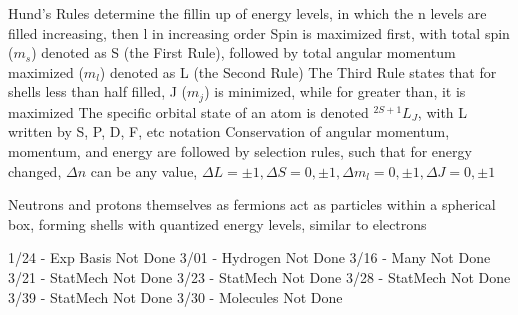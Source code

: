 \documentclass[11 pt, twoside]{article}
\newenvironment{outline*}
{
	\begin{outline}[enumerate]
	}
	{\end{outline}
}
\begin{document}
\begin{outline*}
\1 Hund's Rules determine the fillin up of energy levels, in which the n levels are filled increasing, then l in increasing order
	\2 Spin is maximized first, with total spin ($m_s$) denoted as S (the First Rule), followed by total angular momentum maximized ($m_l$) denoted as L (the Second Rule)
	\2 The Third Rule states that for shells less than half filled, J ($m_j$) is minimized, while for greater than, it is maximized
	\2 The specific orbital state of an atom is denoted $^{2S + 1}L_J$, with L written by S, P, D, F, etc notation
	\2 Conservation of angular momentum, momentum, and energy are followed by selection rules, such that for energy changed, $\Delta n$ can be any value, $\Delta L = \pm 1, \Delta S = 0, \pm 1, \Delta m_l = 0, \pm 1, \Delta J = 0, \pm 1$

\1 Neutrons and protons themselves as fermions act as particles within a spherical box, forming shells with quantized energy levels, similar to electrons

1/24 - Exp Basis Not Done
3/01 - Hydrogen Not Done
3/16 - Many Not Done
3/21 - StatMech Not Done
3/23 - StatMech Not Done
3/28 - StatMech Not Done
3/39 - StatMech Not Done
3/30 - Molecules Not Done

\end{outline*}
\end{document}
